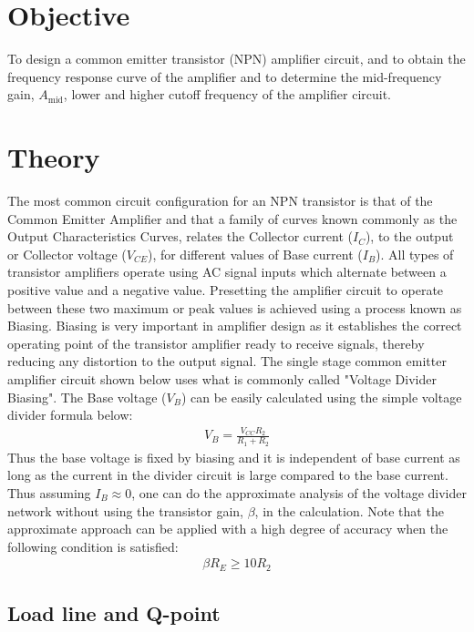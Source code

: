 \section{Objective}

To design a common emitter transistor (NPN) amplifier circuit, and to obtain the frequency response curve of the amplifier and to determine the mid-frequency gain, $A_\text{mid}$, lower and higher cutoff frequency of the amplifier circuit.

\section{Theory}
The most common circuit configuration for an NPN transistor is that of the Common
Emitter Amplifier and that a family of curves known commonly as the Output
Characteristics Curves, relates the Collector current ($I_C$), to the output or Collector
voltage ($V_{CE}$), for different values of Base current ($I_B$). All types of transistor amplifiers
operate using AC signal inputs which alternate between a positive value and a negative
value. Presetting the amplifier circuit to operate between these two maximum or peak
values is achieved using a process known as Biasing. Biasing is very important in
amplifier design as it establishes the correct operating point of the transistor amplifier
ready to receive signals, thereby reducing any distortion to the output signal.
The single stage common emitter amplifier circuit shown below uses what is commonly
called "Voltage Divider Biasing". The Base voltage ($V_B$) can be easily calculated using
the simple voltage divider formula below:
\begin{align}
    V_B = \frac{V_{CC}R_2}{R_1+R_2}
\end{align}
Thus the base voltage is fixed by biasing and it is independent of base current as long as
the current in the divider circuit is large compared to the base current. Thus assuming $I_B \approx 0$, one can do the approximate analysis of the voltage divider network without using the
transistor gain, $\beta$, in the calculation. Note that the approximate approach can be applied
with a high degree of accuracy when the following condition is satisfied:
\begin{align}
    \beta R_E \ge 10R_2
\end{align}

\subsection*{Load line and Q-point}

